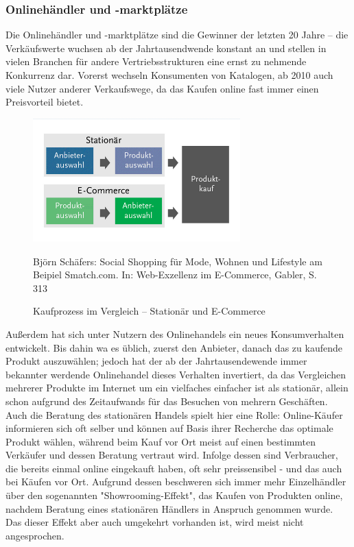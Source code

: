 \begin{folding} \subsubsection{Onlinehändler und -marktplätze}

Die Onlinehändler und -marktplätze sind die Gewinner der letzten 20 Jahre – die Verkäufswerte wuchsen ab der Jahrtausendwende konstant an und stellen in vielen Branchen für andere Vertriebsstrukturen eine ernst zu nehmende Konkurrenz dar\cite{wolf}. Vorerst wechseln Konsumenten von Katalogen, ab 2010 auch viele Nutzer anderer Verkaufswege, da das Kaufen online fast immer einen Preisvorteil bietet\cite[S. 31]{Graf}.
\begin{figure}[h]
    \begin{center}
        \includegraphics[width=8cm]{media/Fabian-konsumwandel.png}
        \caption{Kaufprozess im Vergleich – Stationär und E-Commerce}
        \label{konsumwandel}
        \bildquelle Björn Schäfers: Social Shopping für Mode, Wohnen und Lifestyle am Beipiel Smatch.com. In: Web-Exzellenz im E-Commerce, Gabler, S. 313 %
    \end{center}
\end{figure} 
Außerdem hat sich unter Nutzern des Onlinehandels ein neues Konsumverhalten entwickelt. Bis dahin wa es üblich, zuerst den Anbieter, danach das zu kaufende Produkt auszuwählen; jedoch hat der ab der Jahrtausendewende immer bekannter werdende Onlinehandel dieses Verhalten invertiert, da das Vergleichen mehrerer Produkte im Internet um ein vielfaches einfacher ist als stationär, allein schon aufgrund des Zeitaufwands für das Besuchen von mehrern Geschäften\cite[S 22f]{Graf}. Auch die Beratung des stationären Handels spielt hier eine Rolle: Online-Käufer informieren sich oft selber und können auf Basis ihrer Recherche das optimale Produkt wählen, während beim Kauf vor Ort meist auf einen bestimmten Verkäufer und dessen Beratung vertraut wird\cite[S. 15f]{evilcom}. Infolge dessen sind Verbraucher, die bereits einmal online eingekauft haben, oft sehr preissensibel - und das auch bei Käufen vor Ort\cite[S. 60]{Nitt}. Aufgrund dessen beschweren sich immer mehr Einzelhändler über den sogenannten "Showrooming-Effekt", das Kaufen von Produkten online, nachdem Beratung eines stationären Händlers in Anspruch genommen wurde. Das dieser Effekt aber auch umgekehrt vorhanden ist, wird meist nicht angesprochen\cite[S. 21f]{evilcom}.

\end{folding}
